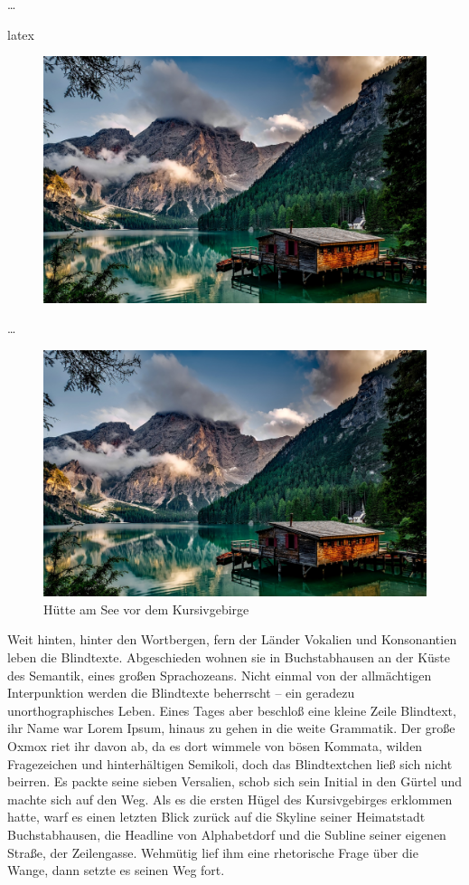 \begin{showcase}
    …
    \begin{code}{latex}
        \begin{figure}
            \centering
            \includegraphics[width=0.5\columnwidth]{assets/images/bilder/pexels-pixabay-147411.jpg}
        \end{figure}
    \end{code}
    …
    \tcblower
    \begin{figure}
        \centering
        \includegraphics[width=0.5\columnwidth]{assets/images/bilder/pexels-pixabay-147411.jpg}
        \caption{Hütte am See vor dem Kursivgebirge}
    \end{figure}
    Weit hinten, hinter den Wortbergen, fern der Länder Vokalien und Konsonantien leben die Blindtexte. Abgeschieden wohnen sie in Buchstabhausen an der Küste des Semantik, eines großen Sprachozeans. Nicht einmal von der allmächtigen Interpunktion werden die Blindtexte beherrscht – ein geradezu unorthographisches Leben. Eines Tages aber beschloß eine kleine Zeile Blindtext, ihr Name war Lorem Ipsum, hinaus zu gehen in die weite Grammatik. Der große Oxmox riet ihr davon ab, da es dort wimmele von bösen Kommata, wilden Fragezeichen und hinterhältigen Semikoli, doch das Blindtextchen ließ sich nicht beirren. Es packte seine sieben Versalien, schob sich sein Initial in den Gürtel und machte sich auf den Weg. Als es die ersten Hügel des Kursivgebirges erklommen hatte, warf es einen letzten Blick zurück auf die Skyline seiner Heimatstadt Buchstabhausen, die Headline von Alphabetdorf und die Subline seiner eigenen Straße, der Zeilengasse. Wehmütig lief ihm eine rhetorische Frage über die Wange, dann setzte es seinen Weg fort.
\end{showcase}
